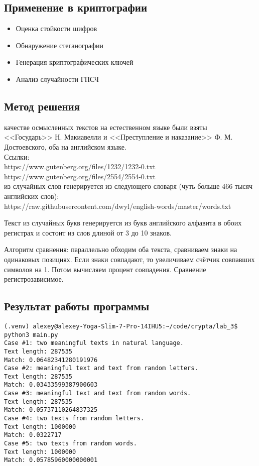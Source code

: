\documentclass[12pt]{article}
\begin{document}
\subsection{Применение в криптографии}
\begin{itemize}
    \item Оценка стойкости шифров
    \item Обнаружение стеганографии
    \item Генерация криптографических ключей
    \item Анализ случайности ГПСЧ
\end{itemize}


\subsection*{Метод решения}
 качестве осмысленных текстов на естественном языке были взяты <<Государь>> Н. Макиавелли и <<Преступление и наказание>> Ф. М. Достоевского, оба на английском языке.\\
Ссылки:\\
https://www.gutenberg.org/files/1232/1232-0.txt\\
https://www.gutenberg.org/files/2554/2554-0.txt\\

 из случайных слов генерируется из следующего словаря (чуть больше 466 тысяч английских слов):\\
https://raw.githubusercontent.com/dwyl/english-words/master/words.txt\\

\par Текст из случайных букв генерируется из букв английского алфавита в обоих регистрах и состоит из слов длиной от 3 до 10 знаков.

\par Алгоритм сравнения: параллельно обходим оба текста, сравниваем знаки на одинаковых позициях. Если знаки совпадают, то увеличиваем счётчик совпавших символов на 1. Потом вычисляем процент совпадения. Сравнение регистрозависимое.



\subsection*{Результат работы программы}
\begin{lstlisting}
(.venv) alexey@alexey-Yoga-Slim-7-Pro-14IHU5:~/code/crypta/lab_3$ python3 main.py 
Case #1: two meaningful texts in natural language.
Text length: 287535
Match: 0.06482341280191976
Case #2: meaningful text and text from random letters.
Text length: 287535
Match: 0.03433599387900603
Case #3: meaningful text and text from random words.
Text length: 287535
Match: 0.05737110264837325
Case #4: two texts from random letters.
Text length: 1000000
Match: 0.0322717
Case #5: two texts from random words.
Text length: 1000000
Match: 0.05785960000000001
\end{lstlisting}
\end{document}
